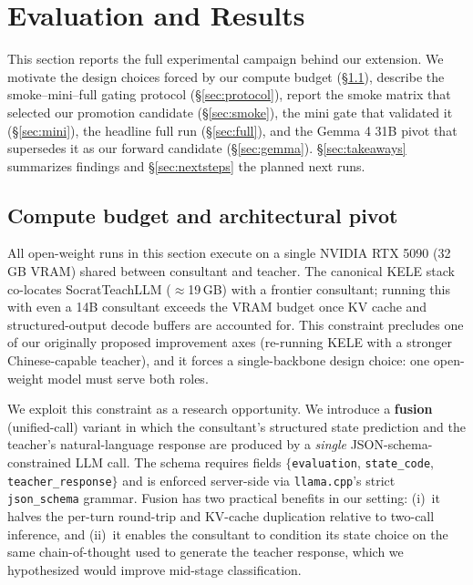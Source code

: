 \documentclass[11pt]{article}
\begin{document}
\section{Evaluation and Results}

This section reports the full experimental campaign behind our extension. We motivate the design choices forced by our compute budget (\S\ref{sec:budget}), describe the smoke--mini--full gating protocol (\S\ref{sec:protocol}), report the smoke matrix that selected our promotion candidate (\S\ref{sec:smoke}), the mini gate that validated it (\S\ref{sec:mini}), the headline full run (\S\ref{sec:full}), and the Gemma 4 31B pivot that supersedes it as our forward candidate (\S\ref{sec:gemma}). \S\ref{sec:takeaways} summarizes findings and \S\ref{sec:nextsteps} the planned next runs.

\subsection{Compute budget and architectural pivot}
\label{sec:budget}

All open-weight runs in this section execute on a single NVIDIA RTX 5090 (32\,GB VRAM) shared between consultant and teacher. The canonical KELE stack co-locates SocratTeachLLM ($\approx$19\,GB) with a frontier consultant; running this with even a 14B consultant exceeds the VRAM budget once KV cache and structured-output decode buffers are accounted for. This constraint precludes one of our originally proposed improvement axes (re-running KELE with a stronger Chinese-capable teacher), and it forces a single-backbone design choice: one open-weight model must serve both roles.

We exploit this constraint as a research opportunity. We introduce a \textbf{fusion} (unified-call) variant in which the consultant's structured state prediction and the teacher's natural-language response are produced by a \emph{single} JSON-schema-constrained LLM call. The schema requires fields $\{$\texttt{evaluation}, \texttt{state\_code}, \texttt{teacher\_response}$\}$ and is enforced server-side via \texttt{llama.cpp}'s strict \texttt{json\_schema} grammar. Fusion has two practical benefits in our setting: (i)~it halves the per-turn round-trip and KV-cache duplication relative to two-call inference, and (ii)~it enables the consultant to condition its state choice on the same chain-of-thought used to generate the teacher response, which we hypothesized would improve mid-stage classification.
\end{document}
